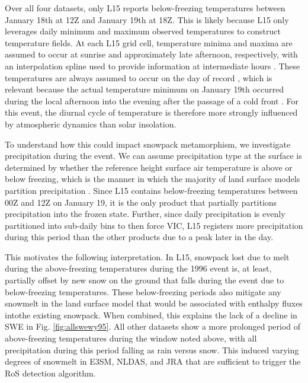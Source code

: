 \documentclass[nhess, manuscript]{copernicus}
\begin{document}
Over all four datasets, only L15 reports below-freezing temperatures between January 18th at 12Z and January 19th at 18Z.
This is likely because L15 only leverages daily minimum and maximum observed temperatures to construct temperature fields.
At each L15 grid cell, temperature minima and maxima are assumed to occur at sunrise and approximately late afternoon, respectively, with an interpolation spline used to provide information at intermediate hours \citep{bohn2013global}.
These temperatures are always assumed to occur on the day of record \citep{livneh2015spatially}, which is relevant because the actual temperature minimum on January 19th occurred during the local afternoon into the evening after the passage of a cold front \citep{leathers1998severe}.
For this event, the diurnal cycle of temperature is therefore more strongly influenced by atmospheric dynamics than solar insolation.

To understand how this could impact snowpack metamorphism, we investigate precipitation during the event.
We can assume precipitation type at the surface is determined by whether the reference height surface air temperature is above or below freezing, which is the manner in which the majority of land surface models partition precipitation \citep{harpold2017rain,jennings2018spatial,Woodburn2021}.
Since L15 contains below-freezing temperatures between 00Z and 12Z on January 19, it is the only product that partially partitions precipitation into the frozen state.
Further, since daily precipitation is evenly partitioned into sub-daily bins to then force VIC, L15 registers more precipitation during this period than the other products due to a peak later in the day.

This motivates the following interpretation.
In L15, snowpack lost due to melt during the above-freezing temperatures during the 1996 event is, at least, partially offset by new snow on the ground that falls during the event due to below-freezing temperatures.
These below-freezing periods also mitigate any snowmelt in the land surface model that would be associated with enthalpy fluxes intothe existing snowpack.
When combined, this explains the lack of a decline in SWE in Fig. \ref{fig:allswewy95}.
All other datasets show a more prolonged period of above-freezing temperatures during the window noted above, with all precipitation during this period falling as rain versus snow.
This induced varying degrees of snowmelt in E3SM, NLDAS, and JRA that are sufficient to trigger the RoS detection algorithm.
\end{document}
